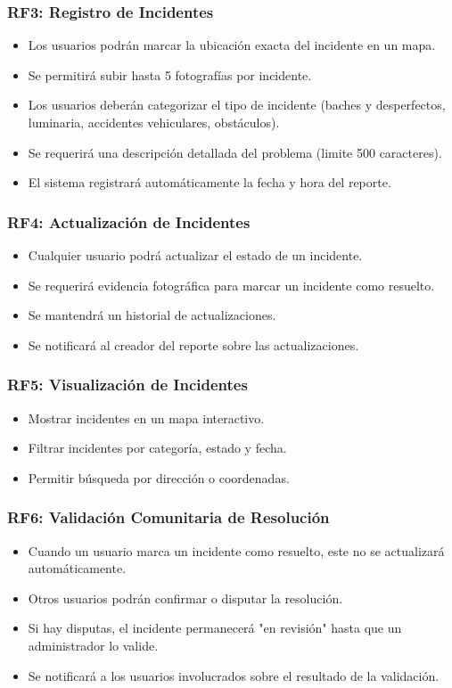\subsubsection{RF3: Registro de Incidentes}
\begin{itemize}
    \item Los usuarios podrán marcar la ubicación exacta del incidente en un mapa.
    \item Se permitirá subir hasta 5 fotografías por incidente.
    \item Los usuarios deberán categorizar el tipo de incidente (baches y desperfectos, luminaria, accidentes vehiculares, obstáculos).
    \item Se requerirá una descripción detallada del problema (limite 500 caracteres).
    \item El sistema registrará automáticamente la fecha y hora del reporte.
\end{itemize}

\subsubsection{RF4: Actualización de Incidentes}
\begin{itemize}
    \item Cualquier usuario podrá actualizar el estado de un incidente.
    \item Se requerirá evidencia fotográfica para marcar un incidente como resuelto.
    \item Se mantendrá un historial de actualizaciones.
    \item Se notificará al creador del reporte sobre las actualizaciones.
\end{itemize}

\subsubsection{RF5: Visualización de Incidentes}
\begin{itemize}
    \item Mostrar incidentes en un mapa interactivo.
    \item Filtrar incidentes por categoría, estado y fecha.
    \item Permitir búsqueda por dirección o coordenadas.
\end{itemize}

\subsubsection{RF6: Validación Comunitaria de Resolución}
\begin{itemize}
    \item Cuando un usuario marca un incidente como resuelto, este no se actualizará automáticamente.
    \item Otros usuarios podrán confirmar o disputar la resolución.
    \item Si hay disputas, el incidente permanecerá "en revisión" hasta que un administrador lo valide.
    \item Se notificará a los usuarios involucrados sobre el resultado de la validación.
\end{itemize}


